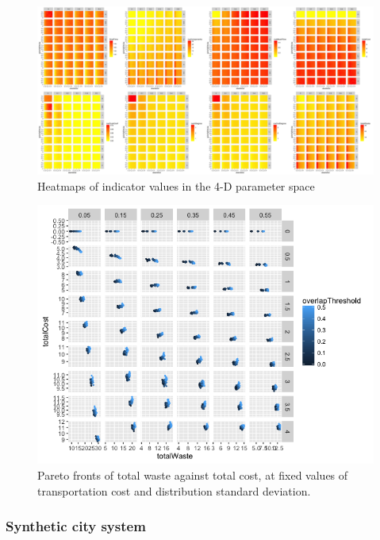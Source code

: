\documentclass{article}
\begin{document}
{%
\begin{figure}
\hspace{-2cm}\includegraphics[width=1.3\textwidth]{figures/heatmap_indics}
\caption{Heatmaps of indicator values in the 4-D parameter space}
\label{fig:heatmap}
\end{figure}

\begin{figure}
\hspace{-2cm}\includegraphics[width=1.3\textwidth]{figures/pareto_wasteCost_overlapThreshold}
\caption{Pareto fronts of total waste against total cost, at fixed values of transportation cost and distribution standard deviation.}
\label{fig:pareto}
\end{figure}



\subsubsection{Synthetic city system}

}
\end{document}
